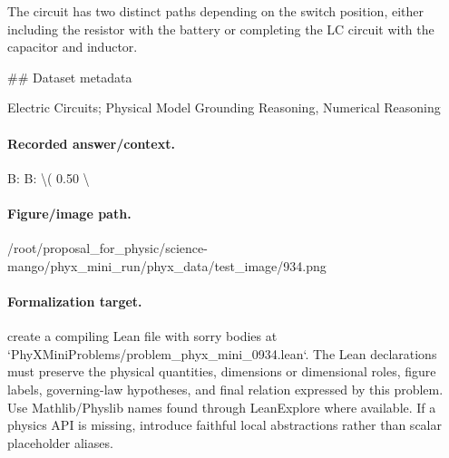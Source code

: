 The circuit has two distinct paths depending on the switch position, either including the resistor with the battery or completing the LC circuit with the capacitor and inductor.

\#\# Dataset metadata

Electric Circuits; Physical Model Grounding Reasoning, Numerical Reasoning

\paragraph{Recorded answer/context.}
B: B: \textbackslash{}( 0.50 \textbackslash{}

\paragraph{Figure/image path.}
/root/proposal\_for\_physic/science-mango/phyx\_mini\_run/phyx\_data/test\_image/934.png

\paragraph{Formalization target.}
create a compiling Lean file with sorry bodies at `PhyXMiniProblems/problem\_phyx\_mini\_0934.lean`. The Lean declarations must preserve the physical quantities, dimensions or dimensional roles, figure labels, governing-law hypotheses, and final relation expressed by this problem.
Use Mathlib/Physlib names found through LeanExplore where available. If a physics API is missing, introduce faithful local abstractions rather than scalar placeholder aliases.

